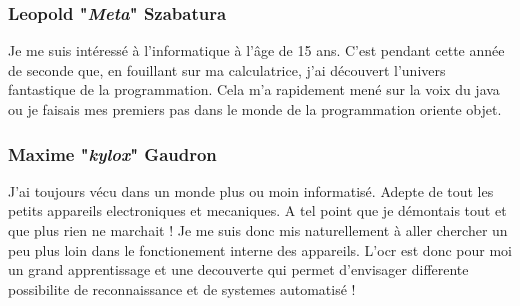 \documentclass[12pt]{article}
\begin{document}
\subsubsection{Leopold "\textit{Meta}" Szabatura}
Je me suis intéressé à l'informatique à l’âge de 15 ans.
C'est pendant cette année de seconde que, en fouillant sur ma calculatrice, j'ai découvert l'univers fantastique de la programmation.
Cela m'a rapidement mené sur la voix du java ou je faisais mes premiers pas dans le monde de la programmation oriente objet.
\subsubsection{Maxime "\textit{kylox}" Gaudron}
J'ai toujours vécu dans un monde plus ou moin informatisé. Adepte de tout les petits appareils electroniques et mecaniques. A tel point que je démontais tout et que plus rien ne marchait ! Je me suis donc mis naturellement à aller chercher un peu plus loin dans le fonctionement interne des appareils. L'ocr est donc pour moi un grand apprentissage et une decouverte qui permet d'envisager differente possibilite de reconnaissance et de systemes automatisé !







\end{document}
